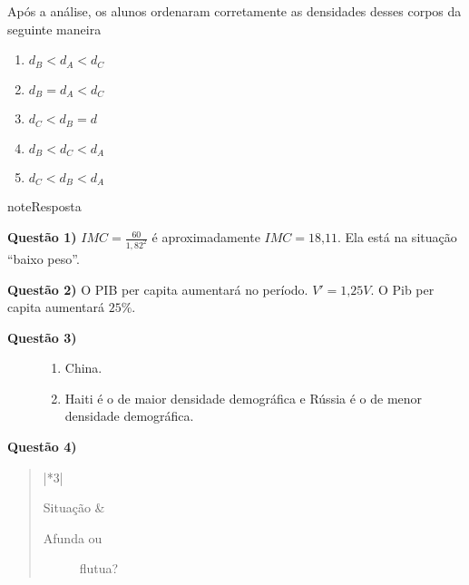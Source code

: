 Após a análise, os alunos ordenaram corretamente as densidades desses corpos da seguinte maneira
\begin{enumerate}
\item {} 
\(d_{B} < d_{A} < d_{C}\)

\item {} 
\(d_{B} = d_{A} < d_{C}\)

\item {} 
\(d_{C} < d_{B} = d_{}\)

\item {} 
\(d_{B} < d_{C} < d_{A}\)

\item {} 
\(d_{C} < d_{B} < d_{A}\)

\end{enumerate}

\begin{sphinxadmonition}{note}{Resposta}

\textbf{Questão 1)} \(IMC=\frac{60}{1,82^2}\) é aproximadamente \(IMC = 18\text{,}11\). Ela está na situação “baixo peso”.

\textbf{Questão 2)} O PIB per capita aumentará no período.  \(V'=1\text{,}25V\). O Pib per capita aumentará \(25\%\).
\begin{description}
\item[{\textbf{Questão 3)}}] \leavevmode\begin{enumerate}
\item {} 
China.

\item {} 
Haiti é o de maior densidade demográfica e Rússia é o de menor densidade demográfica.

\end{enumerate}

\end{description}

\textbf{Questão 4)}
\begin{quote}


\begin{savenotes}\sphinxattablestart
\centering
\begin{tabular}[t]{|*{3}{|}}
\hline

Situação
&\begin{description}
\item[{Afunda ou}] \leavevmode
flutua?


\end{description}
\end{tabular}
\end{savenotes}
\end{quote}
\end{sphinxadmonition}
